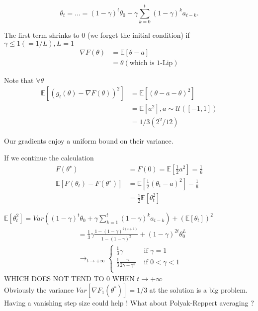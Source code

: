 \[
    \theta _t = ... = (1-\gamma)^t \theta_0 + \gamma \sum_{k=0}^{t}(1-\gamma)^k a_{t-k}
.\]

The first term shrinks to $ 0 $ (we forget the initial condition) if $ \gamma \leq 1 (= 1/L), L = 1 $ 
\begin{align*}
    \nabla F (\theta ) &= \mathbb{E}[ \theta - a] \\
        &= \theta (\text{which is 1-Lip})
\end{align*}

Note that $\forall \theta $
\begin{align*}
    \mathbb{E}[(g_t (\theta ) -\nabla F(\theta ))^2] 
        &= \mathbb{E}[ ( \theta - a - \theta )^2 ] \\
        &= \mathbb{E}[a^2], a \sim \mathcal{U}([-1, 1]) \\
        &= 1/3 (2^2/12)
\end{align*}

Our gradients enjoy a uniform bound on their variance.

If we continue the calculation 
\begin{align*}
    F(\theta ^\star ) 
        &= F(0) = \mathbb{E}[\frac{1}{2} a^2 ] = \frac{1}{6} \\
    \mathbb{E}[F(\theta _t) - F(\theta ^{\star })] 
        &= \mathbb{E}[ \frac{1}{2} (\theta _t - a)^2 ] - \frac{1}{6} \\
        &= \frac{1}{2} \mathbb{E}[\theta _t ^2]
\end{align*}

$\mathbb{E}[\theta _t^2] = Var((1-\gamma )^t \theta_0 + \gamma \sum_{k=1}^{t}(1-\gamma)^k a_{t-k}) + (\mathbb{E}[\theta _t])^2$
\begin{align*}
    &= \frac{1}{3} \gamma  \frac{1 - ( 1 - \gamma )^{2 (t+1)} }{1 - ( 1 - \gamma )^2 } + ( 1 - \gamma )^{2t} \theta _0^L \\
    &\to _{t \to +\infty} \begin{cases}
        \frac{1}{3} \gamma  &\text{ if } \gamma = 1 \\
        \frac{1}{3} \frac{\gamma }{2 \gamma - \gamma ^2} &\text{ if } 0 < \gamma < 1 \\
    \end{cases} 
\end{align*}
WHICH DOES NOT TEND TO $ 0 $ WHEN $t \to + \infty $ \\
Obviously the variance $ Var [ \nabla F_1(\theta ^*)] = 1/3 $  at the solution is a big problem.
Having a vanishing step size could help ! What about Polyak-Reppert averaging ? 
